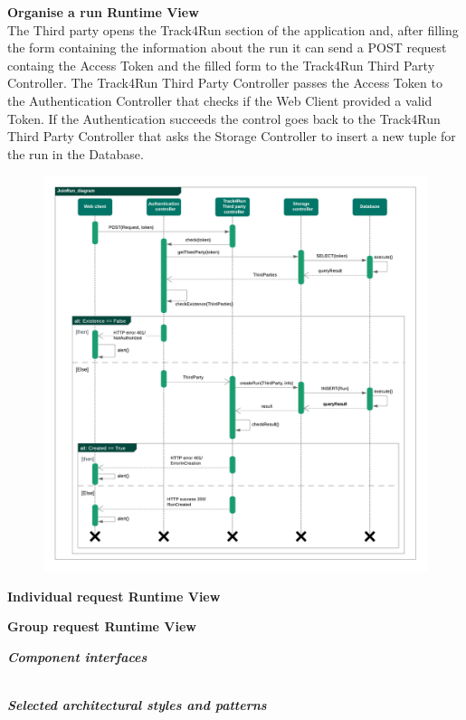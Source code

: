 \begin{legal}
\begin{legal}
				\newpage
				\item \textbf{Organise a run Runtime View}\\
The Third party opens the Track4Run section of the application and, after filling the form containing the information about the run it can send a POST request containg the Access Token and the filled form to the Track4Run Third Party Controller.
The Track4Run Third Party Controller passes the Access Token to the Authentication Controller that checks if the Web Client provided a valid Token.
If the Authentication succeeds the control goes back to the Track4Run Third Party Controller that asks the Storage Controller to insert a new tuple for the run in the Database.
				\begin{figure}[H]
				\includegraphics[width=\linewidth]{images/seq_diagrams/seq_OrganizeRun.png}\\
				\end{figure}
				
				\newpage
				\item \textbf{Individual request Runtime View}\\
				
				\newpage
				\item \textbf{Group request Runtime View}\\
			\end {legal}
		\item \textit{\textbf{Component interfaces}}\\\\
		\item \textit{\textbf{Selected architectural styles and patterns}}\\\\
  	\end{legal}
